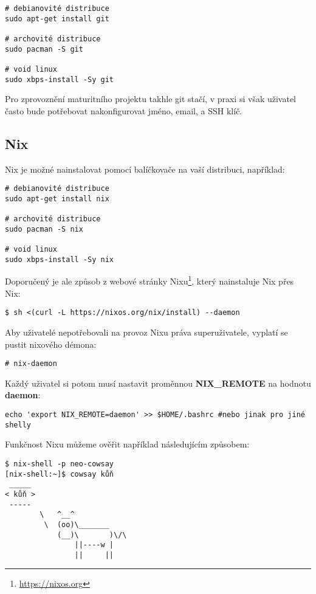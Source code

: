 \documentclass[11pt,a4paper,twoside,openright]{report}
\begin{document}
\begin{verbatim}
# debianovité distribuce
sudo apt-get install git

# archovité distribuce
sudo pacman -S git

# void linux
sudo xbps-install -Sy git
\end{verbatim}

Pro zprovoznění maturitního projektu takhle git stačí, v praxi si však uživatel často bude potřebovat
nakonfigurovat jméno, email, a SSH klíč.

\subsection{Nix}
Nix je možné nainstalovat pomocí balíčkovače na vaší distribuci, například:

\begin{verbatim}
# debianovité distribuce
sudo apt-get install nix

# archovité distribuce
sudo pacman -S nix

# void linux
sudo xbps-install -Sy nix
\end{verbatim}

Doporučený je ale způsob z webové stránky Nixu\footnote{\url{https://nixos.org}}, který nainstaluje
Nix přes Nix:
\begin{verbatim}
$ sh <(curl -L https://nixos.org/nix/install) --daemon
\end{verbatim}

Aby uživatelé nepotřebovali na provoz Nixu práva superuživatele, vyplatí se pustit nixového démona:
\begin{verbatim}
# nix-daemon
\end{verbatim}

Každý uživatel si potom musí nastavit proměnnou  {\bf NIX\_REMOTE} na hodnotu {\bf daemon}:

\begin{verbatim}
echo 'export NIX_REMOTE=daemon' >> $HOME/.bashrc #nebo jinak pro jiné shelly
\end{verbatim}

Funkčnost Nixu můžeme ověřit například následujícím způsobem:

\begin{verbatim}
$ nix-shell -p neo-cowsay
[nix-shell:~]$ cowsay kůň
 _____
< kůň >
 -----
        \   ^__^
         \  (oo)\_______
            (__)\       )\/\
                ||----w |
                ||     ||
\end{verbatim}
\end{document}
